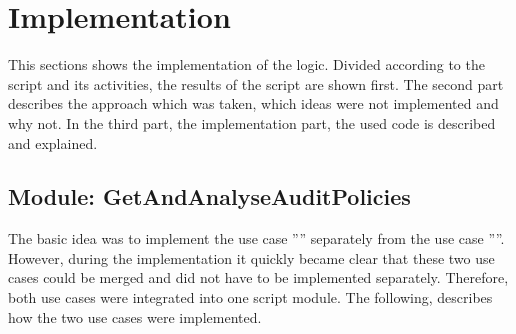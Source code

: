 \section{Implementation}
This sections shows the implementation of the logic. Divided according to the script and its activities, the results of the script are shown first. The second part describes the approach which was taken, which ideas were not implemented and why not. In the third part, the implementation part, the used code is described and explained.
\subsection{Module: GetAndAnalyseAuditPolicies}
The basic idea was to implement the use case '''' separately from the use case ''''. However, during the implementation it quickly became clear that these two use cases could be merged and did not have to be implemented separately. Therefore, both use cases were integrated into one script module. The following, describes how the two use cases were implemented.

